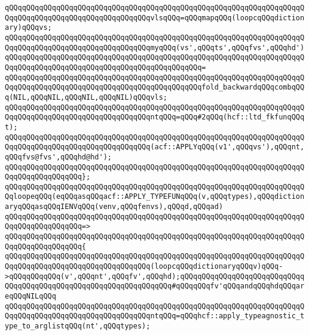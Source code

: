 \newline
\verb|qQQqqQQqqQQqqQQqqQQqqQQqqQQqqQQqqQQqqQQqqQQqqQQqqQQqqQQqqQQqqQQqqQQqqQQqqQQqqQQqqQQqqQQqqQQqqQQqqQQqqQQqvlsqQQq=qQQqmapqQQq(loopcqQQqdictionary)qQQqvs;|\newline
\newline
\verb|qQQqqQQqqQQqqQQqqQQqqQQqqQQqqQQqqQQqqQQqqQQqqQQqqQQqqQQqqQQqqQQqqQQqqQQqqQQqqQQqqQQqqQQqqQQqqQQqqQQqqQQqmyqQQq(vs',qQQqts',qQQqfvs',qQQqhd')|\newline
\verb|qQQqqQQqqQQqqQQqqQQqqQQqqQQqqQQqqQQqqQQqqQQqqQQqqQQqqQQqqQQqqQQqqQQqqQQqqQQqqQQqqQQqqQQqqQQqqQQqqQQqqQQqqQQqqQQqqQQq=|\newline
\verb|qQQqqQQqqQQqqQQqqQQqqQQqqQQqqQQqqQQqqQQqqQQqqQQqqQQqqQQqqQQqqQQqqQQqqQQqqQQqqQQqqQQqqQQqqQQqqQQqqQQqqQQqqQQqqQQqqQQqfold_backwardqQQqcombqQQq(NIL,qQQqNIL,qQQqNIL,qQQqNIL)qQQqvls;|\newline
\newline
\verb|qQQqqQQqqQQqqQQqqQQqqQQqqQQqqQQqqQQqqQQqqQQqqQQqqQQqqQQqqQQqqQQqqQQqqQQqqQQqqQQqqQQqqQQqqQQqqQQqqQQqqQQqntqQQq=qQQq#2qQQq(hcf::ltd_fkfunqQQqt);|\newline
\newline
\verb|qQQqqQQqqQQqqQQqqQQqqQQqqQQqqQQqqQQqqQQqqQQqqQQqqQQqqQQqqQQqqQQqqQQqqQQqqQQqqQQqqQQqqQQqqQQqqQQqqQQqqQQq(acf::APPLYqQQq(v1',qQQqvs'),qQQqnt,qQQqfvs@fvs',qQQqhd@hd');|\newline
\verb|qQQqqQQqqQQqqQQqqQQqqQQqqQQqqQQqqQQqqQQqqQQqqQQqqQQqqQQqqQQqqQQqqQQqqQQqqQQqqQQqqQQqqQQq};|\newline
\newline
\verb|qQQqqQQqqQQqqQQqqQQqqQQqqQQqqQQqqQQqqQQqqQQqqQQqqQQqqQQqqQQqqQQqqQQqqQQqloopeqQQq(eqQQqasqQQqacf::APPLY_TYPEFUNqQQq(v,qQQqtypes),qQQqdictionaryqQQqasqQQqIENVqQQq(venv,qQQqfenvs),qQQqd,qQQqad)|\newline
\verb|qQQqqQQqqQQqqQQqqQQqqQQqqQQqqQQqqQQqqQQqqQQqqQQqqQQqqQQqqQQqqQQqqQQqqQQqqQQqqQQqqQQqqQQq=>|\newline
\verb|qQQqqQQqqQQqqQQqqQQqqQQqqQQqqQQqqQQqqQQqqQQqqQQqqQQqqQQqqQQqqQQqqQQqqQQqqQQqqQQqqQQqqQQq{|\newline
\verb|qQQqqQQqqQQqqQQqqQQqqQQqqQQqqQQqqQQqqQQqqQQqqQQqqQQqqQQqqQQqqQQqqQQqqQQqqQQqqQQqqQQqqQQqqQQqqQQqqQQqqQQq(loopcqQQqdictionaryqQQqv)qQQq->qQQqqQQqqQQq(v',qQQqnt',qQQqfv',qQQqhd);qQQqqQQqqQQqqQQqqQQqqQQqqQQqqQQqqQQqqQQqqQQqqQQqqQQqqQQqqQQqqQQqqQQq#qQQqqQQqfv'qQQqandqQQqhdqQQqareqQQqNILqQQq|\newline
\newline
\verb|qQQqqQQqqQQqqQQqqQQqqQQqqQQqqQQqqQQqqQQqqQQqqQQqqQQqqQQqqQQqqQQqqQQqqQQqqQQqqQQqqQQqqQQqqQQqqQQqqQQqqQQqntqQQq=qQQqhcf::apply_typeagnostic_type_to_arglistqQQq(nt',qQQqtypes);|\newline
